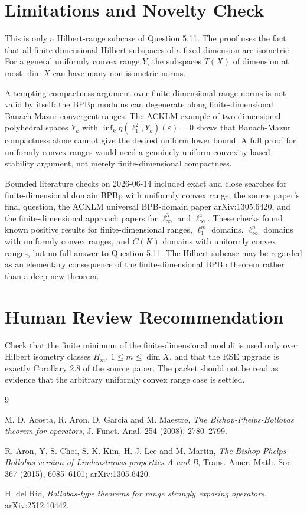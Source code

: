 \documentclass[11pt]{article}
\begin{document}
\section*{Limitations and Novelty Check}

This is only a Hilbert-range subcase of Question 5.11.  The proof uses the
fact that all finite-dimensional Hilbert subspaces of a fixed dimension are
isometric.  For a general uniformly convex range \(Y\), the subspaces
\(T(X)\) of dimension at most \(\dim X\) can have many non-isometric norms.

A tempting compactness argument over finite-dimensional range norms is not
valid by itself: the BPBp modulus can degenerate along finite-dimensional
Banach-Mazur convergent ranges.  The ACKLM example of two-dimensional
polyhedral spaces \(Y_k\) with
\(\inf_k \eta(\ell_1^2,Y_k)(\varepsilon)=0\) shows that Banach-Mazur
compactness alone cannot give the desired uniform lower bound.  A full proof
for uniformly convex ranges would need a genuinely uniform-convexity-based
stability argument, not merely finite-dimensional compactness.

Bounded literature checks on 2026-06-14 included exact and close searches
for finite-dimensional domain BPBp with uniformly convex range, the source
paper's final question, the ACKLM universal BPB-domain paper
arXiv:1305.6420, and the finite-dimensional approach papers for
\(\ell_\infty^3\) and \(\ell_\infty^4\).  These checks found known positive
results for finite-dimensional ranges, \(\ell_1^m\) domains, \(\ell_\infty^n\)
domains with uniformly convex ranges, and \(C(K)\) domains with uniformly
convex ranges, but no full answer to Question 5.11.  The Hilbert subcase may
be regarded as an elementary consequence of the finite-dimensional BPBp
theorem rather than a deep new theorem.

\section*{Human Review Recommendation}

Check that the finite minimum of the finite-dimensional moduli is used only
over Hilbert isometry classes \(H_m\), \(1\le m\le \dim X\), and that the
RSE upgrade is exactly Corollary 2.8 of the source paper.  The packet should
not be read as evidence that the arbitrary uniformly convex range case is
settled.

\begin{thebibliography}{9}

M. D. Acosta, R. Aron, D. Garcia and M. Maestre,
\emph{The Bishop-Phelps-Bollobas theorem for operators},
J. Funct. Anal. 254 (2008), 2780--2799.

R. Aron, Y. S. Choi, S. K. Kim, H. J. Lee and M. Martin,
\emph{The Bishop-Phelps-Bollobas version of Lindenstrauss properties A and B},
Trans. Amer. Math. Soc. 367 (2015), 6085--6101; arXiv:1305.6420.

H. del Rio,
\emph{Bollobas-type theorems for range strongly exposing operators},
arXiv:2512.10442.

\end{thebibliography}
\end{document}
